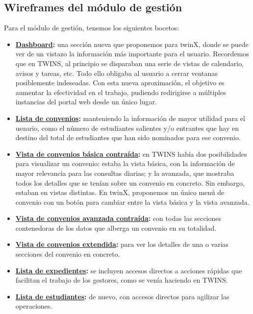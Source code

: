 \subsection{Wireframes del módulo de gestión}

Para el módulo de gestión, tenemos los siguientes bocetos:

\begin{itemize}
	\item \textbf{\hyperref[fig:dashboardWF]{Dashboard}:} una sección nueva que proponemos para twinX, donde se puede ver de un vistazo la información más importante para el usuario. Recordemos que en TWINS, al principio se disparaban una serie de vistas de calendario, avisos y tareas, etc. Todo ello obligaba al usuario a cerrar ventanas posiblemente indeseadas. Con esta nueva aproximación, el objetivo es aumentar la efectividad en el trabajo, pudiendo redirigirse a múltiples instancias del portal web desde un único lugar.
	\item \textbf{\hyperref[fig:convenios_listaWF]{Lista de convenios}:} manteniendo la información de mayor utilidad para el usuario, como el número de estudiantes salientes y/o entrantes que hay en destino del total de estudiantes que han sido nominados para ese convenio.
	\item \textbf{\hyperref[fig:vista_conv_basica_contWF]{Vista de convenios básica contraída}:} en TWINS había dos posibilidades para visualizar un convenio: estaba la vista básica, con la información de mayor relevancia para las consultas diarias; y la avanzada, que mostraba todos los detalles que se tenían sobre un convenio en concreto. Sin embargo, estaban en vistas distintas. En twinX, proponemos un único menú de convenio con un botón para cambiar entre la vista básica y la vista avanzada.
	\item \textbf{\hyperref[fig:vista_conv_avanzada_contWF]{Vista de convenios avanzada contraída}:} con todas las secciones contenedoras de los datos que alberga un convenio en su totalidad.
	\item \textbf{\hyperref[fig:vista_conv_extendidaWF]{Vista de convenios extendida}:} para ver los detalles de una o varias secciones del convenio en concreto.
	\item \textbf{\hyperref[fig:expedientes_listaWF]{Lista de expedientes}:} se incluyen accesos directos a acciones rápidas que facilitan el trabajo de los gestores, como se venía haciendo en TWINS.
	\item \textbf{\hyperref[fig:estudiantes_listaWF]{Lista de estudiantes}:} de nuevo, con accesos directos para agilizar las operaciones.

\end{itemize}

